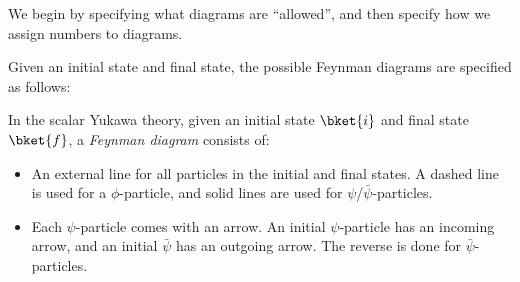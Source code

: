 \documentclass[a4paper]{article}
\begin{document}
We begin by specifying what diagrams are ``allowed'', and then specify how we assign numbers to diagrams.

Given an initial state and final state, the possible Feynman diagrams are specified as follows:
\begin{defi}
  In the scalar Yukawa theory, given an initial state $\bket{i}$ and final state $\bket{f}$, a \emph{Feynman diagram} consists of:
  \begin{itemize}
    \item An external line for all particles in the initial and final states. A dashed line is used for a $\phi$-particle, and solid lines are used for $\psi$/$\bar\psi$-particles.
    \begin{center}
    \end{center}
  \item Each $\psi$-particle comes with an arrow. An initial $\psi$-particle has an incoming arrow, and an initial $\bar\psi$ has an outgoing arrow. The reverse is done for $\bar\psi$-particles.
    \begin{center}
\end{center}
\end{itemize}
\end{defi}
\end{document}
